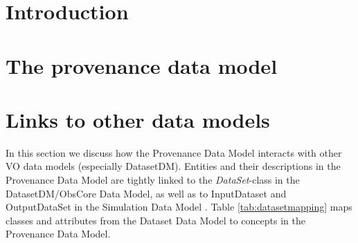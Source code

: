 \documentclass[11pt,a4paper]{ivoa}
\newcommand{\class}[1]{\emph{#1}}
\begin{document}
\section{Introduction}





\section{The provenance data model}



\section{Links to other data models}\label{sec:dmlinks}
In this section we discuss how the Provenance Data Model interacts with
other VO data models (especially DatasetDM).
Entities and their descriptions in the Provenance Data Model 
are tightly linked to the \class{DataSet}-class in the DatasetDM/ObsCore Data Model, as well as to 
InputDataset and OutputDataSet in the Simulation Data Model \citep[SimDM,][]{std:SimDM}.
Table \ref{tab:datasetmapping} maps classes and attributes from the Dataset Data Model 
to concepts in the Provenance Data Model.

\end{document}
